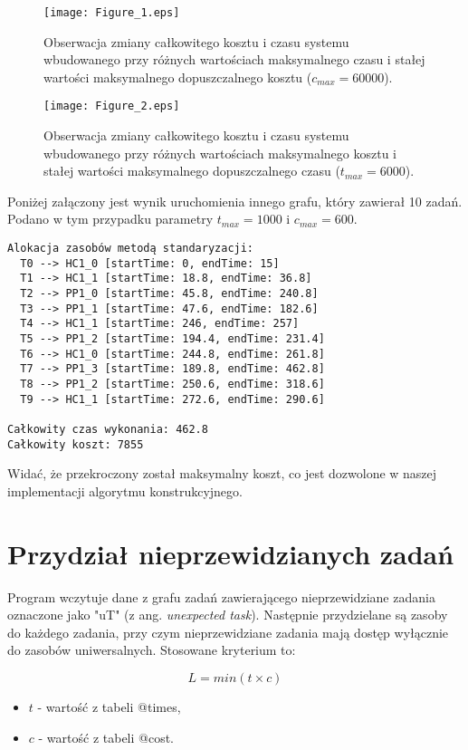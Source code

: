 \documentclass[a4paper,11pt]{article}
\begin{document}
\begin{figure}[H]
    \texttt{[image: Figure\_1.eps]}
    \caption{Obserwacja zmiany całkowitego kosztu i czasu systemu wbudowanego przy różnych wartościach maksymalnego czasu i stałej wartości maksymalnego dopuszczalnego kosztu (\(c_{max}=60000\)).}
    \label{fig:plot_1}
\end{figure}

\begin{figure}[H]
    \texttt{[image: Figure\_2.eps]}
    \caption{Obserwacja zmiany całkowitego kosztu i czasu systemu wbudowanego przy różnych wartościach maksymalnego kosztu i stałej wartości maksymalnego dopuszczalnego czasu (\(t_{max}=6000\)).}
    \label{fig:plot_2}
\end{figure}

Poniżej załączony jest wynik uruchomienia innego grafu, który zawierał 10
zadań. Podano w tym przypadku parametry \(t_{max}=1000\) i \(c_{max}=600\).

\begin{verbatim}
Alokacja zasobów metodą standaryzacji:
  T0 --> HC1_0 [startTime: 0, endTime: 15]
  T1 --> HC1_1 [startTime: 18.8, endTime: 36.8]
  T2 --> PP1_0 [startTime: 45.8, endTime: 240.8]
  T3 --> PP1_1 [startTime: 47.6, endTime: 182.6]
  T4 --> HC1_1 [startTime: 246, endTime: 257]
  T5 --> PP1_2 [startTime: 194.4, endTime: 231.4]
  T6 --> HC1_0 [startTime: 244.8, endTime: 261.8]
  T7 --> PP1_3 [startTime: 189.8, endTime: 462.8]
  T8 --> PP1_2 [startTime: 250.6, endTime: 318.6]
  T9 --> HC1_1 [startTime: 272.6, endTime: 290.6]

Całkowity czas wykonania: 462.8
Całkowity koszt: 7855    
\end{verbatim}

Widać, że przekroczony został maksymalny koszt, co jest dozwolone 
w naszej implementacji algorytmu konstrukcyjnego.

\section{Przydział nieprzewidzianych zadań}

Program wczytuje dane z grafu zadań zawierającego nieprzewidziane zadania
oznaczone jako "uT" (z ang. \textit{unexpected task}). Następnie przydzielane 
są zasoby do każdego zadania, przy czym nieprzewidziane zadania mają dostęp
wyłącznie do zasobów uniwersalnych. Stosowane kryterium to:

\begin{equation}
    L = min(t \times c)
\end{equation}
\begin{itemize}
\item \(t\) - wartość z tabeli @times,
\item \(c\) - wartość z tabeli @cost.
\end{itemize}
\end{document}
